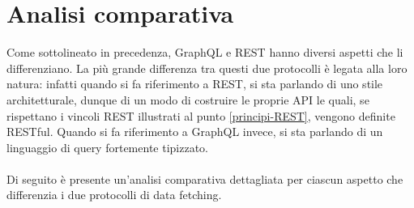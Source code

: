 \section{Analisi comparativa}
Come sottolineato in precedenza, GraphQL e REST hanno diversi aspetti che li differenziano. La più grande differenza tra questi due protocolli è legata alla loro natura: infatti quando si fa riferimento a REST, si sta parlando di uno stile architetturale, dunque di un modo di costruire le proprie API le quali, se rispettano i vincoli REST illustrati al punto \ref{principi-REST}, vengono definite RESTful. Quando si fa riferimento a GraphQL invece, si sta parlando di un linguaggio di query fortemente tipizzato.\\\\
Di seguito è presente un'analisi comparativa dettagliata per ciascun aspetto che differenzia i due protocolli di data fetching.
